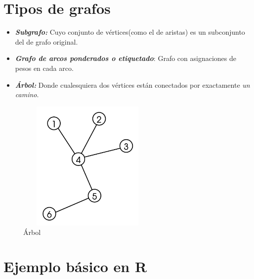 \documentclass[]{book}
\begin{document}
\section{Tipos de grafos}\label{tipos-de-grafos}

\begin{itemize}
\item
  \textbf{\emph{Subgrafo:}} Cuyo conjunto de vértices(como el de
  aristas) es un subconjunto del de grafo original.
\item
  \textbf{\emph{Grafo de arcos ponderados o etiquetado}}: Grafo con
  asignaciones de pesos en cada arco.
\item
  \textbf{\emph{Árbol:}} Donde cualesquiera dos vértices están
  conectados por exactamente \emph{un camino}.
\end{itemize}

\begin{figure}

{\centering \includegraphics[width=260,height=240]{Tree_graph} 

}

\caption{Árbol}\label{fig:unnamed-chunk-3}
\end{figure}

\section{Ejemplo básico en R}\label{ejemplo-basico-en-r}
\end{document}
